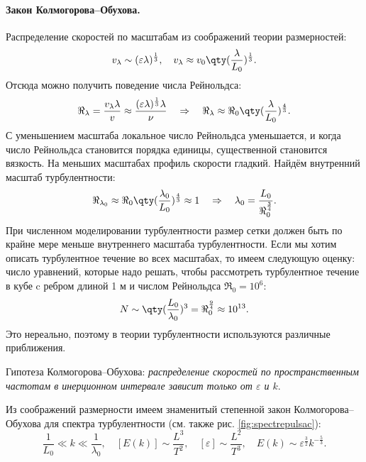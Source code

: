 \paragraph{Закон Колмогорова--Обухова. } Распределение скоростей по масштабам из
соображений теории размерностей:
\begin{equation}
    v_\lambda \sim (\varepsilon \lambda)^\frac{1}{3},
    \quad
    v_\lambda \approx v_0 \qty(\frac{\lambda}{L_0})^\frac{1}{3}.
\end{equation}
Отсюда можно получить поведение числа Рейнольдса:
\begin{equation}
    \Re_{\lambda} = \frac{v_\lambda \lambda}{v} \approx
        \frac{(\varepsilon \lambda)^\frac{1}{3} \lambda}{\nu}
        \quad\Rightarrow\quad
        \Re_\lambda \approx \Re_0 \qty(\frac{\lambda}{L_0})^\frac{4}{3}.
\end{equation}
С уменьшением масштаба локальное число Рейнольдса уменьшается, и когда число Рейнольдса становится порядка единицы, существенной становится вязкость. На  меньших масштабах профиль скорости  гладкий. Найдём внутренний масштаб турбулентности:
\begin{equation}
    \Re_{\lambda_0} \approx \Re_0
        \qty(\frac{\lambda_0}{L_0})^\frac{4}{3}    \approx 1
        \quad\Rightarrow\quad
        \lambda_0 = \frac{L_0}{\Re_0^\frac{3}{4}}.
\end{equation}
При численном моделировании турбулентности размер сетки должен быть по крайне мере меньше внутреннего масштаба турбулентности. Если мы хотим описать турбулентное течение во всех масштабах, то имеем следующую оценку: число уравнений, которые надо решать, чтобы рассмотреть турбулентное течение в кубе c ребром длиной 1 м и числом Рейнольдса \mbox{$\Re_0=10^6$:}
\begin{equation}
    N \sim \qty(\frac{L_0}{\lambda_0})^3= \Re_0^{\frac{9}{4}} \approx 10^{13}.
\end{equation}
Это нереально, поэтому в теории турбулентности используются различные приближения.

Гипотеза Колмогорова--Обухова: \textit{распределение скоростей по пространственным частотам в инерционном интервале зависит только от $\varepsilon$ и $k$}.

Из соображений размерности имеем знаменитый степенной закон Колмогорова--Обухова для спектра турбулентности (см. также рис. \ref{fig:spectrepulsac}):
\begin{equation}
    \frac{1}{L_0} \ll k \ll \frac{1}{\lambda_0}, \quad
    [E(k)] \sim \frac{L^3}{T^2}, \quad [\varepsilon]\sim \frac{L^2}{T^3},
    \quad  E(k) \sim \varepsilon^\frac{3}{2} k^{-\frac{5}{3}}.
\end{equation}


